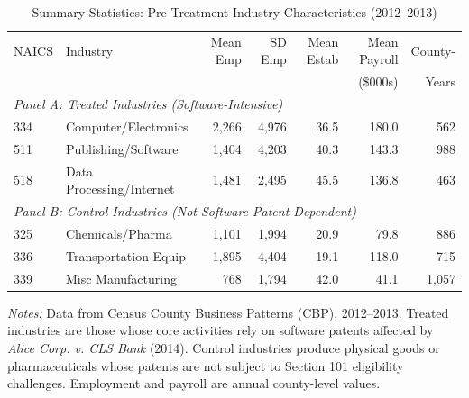 \begin{table}[t]
\centering
\caption{Summary Statistics: Pre-Treatment Industry Characteristics (2012--2013)}
\label{tab:summary}
\footnotesize
\begin{tabular}{llrrrrr}
\toprule
NAICS & Industry & Mean Emp & SD Emp & Mean Estab & Mean Payroll & County- \\
 & & & & & (\$000s) & Years \\
\midrule
\multicolumn{7}{l}{\textit{Panel A: Treated Industries (Software-Intensive)}} \\
334 & Computer/Electronics & 2,266 & 4,976 & 36.5 & 180.0 & 562 \\
511 & Publishing/Software & 1,404 & 4,203 & 40.3 & 143.3 & 988 \\
518 & Data Processing/Internet & 1,481 & 2,495 & 45.5 & 136.8 & 463 \\
\midrule
\multicolumn{7}{l}{\textit{Panel B: Control Industries (Not Software Patent-Dependent)}} \\
325 & Chemicals/Pharma & 1,101 & 1,994 & 20.9 & 79.8 & 886 \\
336 & Transportation Equip & 1,895 & 4,404 & 19.1 & 118.0 & 715 \\
339 & Misc Manufacturing & 768 & 1,794 & 42.0 & 41.1 & 1,057 \\
\bottomrule
\end{tabular}
\begin{tablenotes}
\item \textit{Notes:} Data from Census County Business Patterns (CBP), 2012--2013.
Treated industries are those whose core activities rely on software patents affected by
\textit{Alice Corp. v. CLS Bank} (2014). Control industries produce physical goods or
pharmaceuticals whose patents are not subject to Section 101 eligibility challenges.
Employment and payroll are annual county-level values.
\end{tablenotes}
\end{table}
